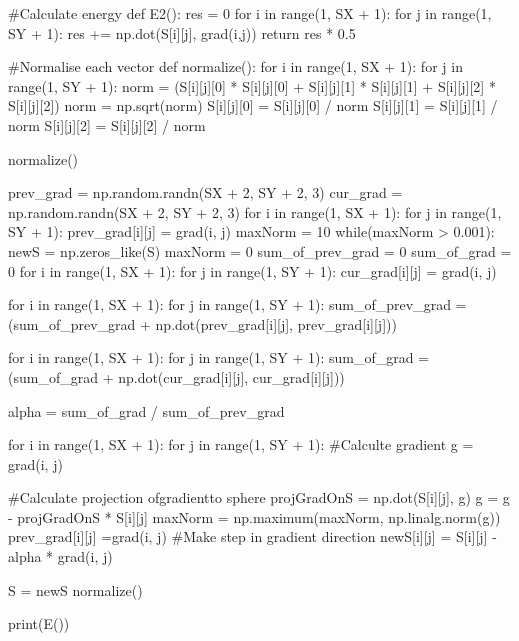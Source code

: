 \documentclass[ 12pt,x11names]{article}
\begin{document}
\begin{python}
#Calculate energy
def E2():
    res = 0
    for i in range(1, SX + 1):
        for j in range(1, SY + 1):
            res += np.dot(S[i][j], grad(i,j))
    return res * 0.5

#Normalise each vector
def normalize():
    for i in range(1, SX + 1):
        for j in range(1, SY + 1):
            norm = (S[i][j][0] * S[i][j][0] +
                    S[i][j][1] * S[i][j][1] +
                    S[i][j][2] * S[i][j][2])
            norm = np.sqrt(norm)
            S[i][j][0] = S[i][j][0] / norm
            S[i][j][1] = S[i][j][1] / norm
            S[i][j][2] = S[i][j][2] / norm

normalize()

prev_grad =  np.random.randn(SX + 2, SY + 2, 3)
cur_grad = np.random.randn(SX + 2, SY + 2, 3)
for i in range(1, SX + 1):
    for j in range(1, SY + 1):
        prev_grad[i][j] = grad(i, j)
maxNorm = 10
while(maxNorm > 0.001):
    newS = np.zeros_like(S)
    maxNorm = 0
    sum_of_prev_grad = 0
    sum_of_grad  =  0
    for i in range(1, SX + 1):
        for j in range(1, SY + 1):
            cur_grad[i][j] = grad(i,  j)

    for i in range(1, SX + 1):
        for j in range(1, SY + 1):
            sum_of_prev_grad = (sum_of_prev_grad
            + np.dot(prev_grad[i][j], prev_grad[i][j]))

    for i in range(1, SX + 1):
        for j in range(1, SY + 1):
            sum_of_grad = (sum_of_grad
            + np.dot(cur_grad[i][j], cur_grad[i][j]))

    alpha = sum_of_grad / sum_of_prev_grad

    for i in range(1, SX + 1):
        for j in range(1, SY + 1):
            #Calculte gradient
            g = grad(i,  j)

            #Calculate projection ofgradientto sphere
            projGradOnS = np.dot(S[i][j], g)
            g = g - projGradOnS * S[i][j]
            maxNorm = np.maximum(maxNorm, np.linalg.norm(g))
            prev_grad[i][j] =grad(i, j)
            #Make step in gradient direction
            newS[i][j] = S[i][j] - alpha * grad(i, j)

    S = newS
    normalize()

print(E())

 \end{python}
\end{document}
